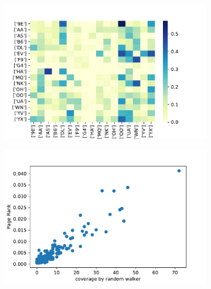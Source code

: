 \documentclass{svproc}
\begin{document}
\begin{figure}
\begin{subfigure}{0.45\textwidth}
	\includegraphics[width=\textwidth]{img/planes/intricplanes.pdf}
\end{subfigure}
\begin{subfigure}{0.45\textwidth}
	\includegraphics[width=\textwidth]{img/planes/prVSrw.pdf}
\end{subfigure}
\end{figure}
\end{document}
